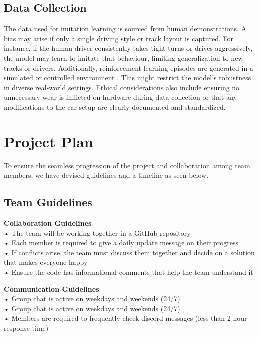 \documentclass{article} %
\begin{document}
\subsection{Data Collection}
The data used for imitation learning is sourced from human demonstrations. A bias may arise if only a single driving style or track layout is captured.
For instance, if the human driver consistently takes tight turns or drives aggressively, the model may learn to imitate that behaviour, limiting 
generalization to new tracks or drivers. Additionally, reinforcement learning episodes are generated in a simulated or controlled environment 
\citep{laskey2017comparinghumancentricrobotcentricsampling}. 
This might restrict the model's robustness in diverse real-world settings. Ethical considerations also include ensuring no unnecessary wear is inflicted 
on hardware during data collection or that any modifications to the car setup are clearly documented and standardized.

\section{Project Plan}
To ensure the seamless progression of the project and collaboration among team members, we have devised guidelines and a timeline as seen below.

\subsection{Team Guidelines}

\textbf{Collaboration Guidelines}
\\• The team will be working together in a GitHub repository
\\• Each member is required to give a daily update message on their progress
\\• If conflicts arise, the team must discuss them together and decide on a solution that makes everyone happy
\\• Ensure the code has informational comments that help the team understand it



\textbf{Communication Guidelines}
\\• Group chat is active on weekdays and weekends (24/7)
\\• Group chat is active on weekdays and weekends (24/7)
\\• Members are required to frequently check discord messages (less than 2 hour response time)
\end{document}
